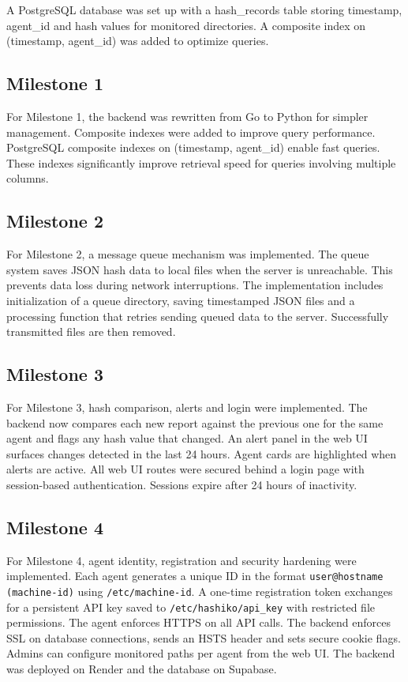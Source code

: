 \documentclass[conference]{IEEEtran}
\begin{document}
A PostgreSQL database was set up with a hash\_records table storing timestamp, agent\_id and hash values for monitored directories. A composite index on (timestamp, agent\_id) was added to optimize queries.

\subsection{Milestone 1}

For Milestone 1, the backend was rewritten from Go to Python for simpler management. Composite indexes were added to improve query performance. PostgreSQL composite indexes on (timestamp, agent\_id) enable fast queries. These indexes significantly improve retrieval speed for queries involving multiple columns.

\subsection{Milestone 2}

For Milestone 2, a message queue mechanism was implemented. The queue system saves JSON hash data to local files when the server is unreachable. This prevents data loss during network interruptions. The implementation includes initialization of a queue directory, saving timestamped JSON files and a processing function that retries sending queued data to the server. Successfully transmitted files are then removed.

\subsection{Milestone 3}

For Milestone 3, hash comparison, alerts and login were implemented. The backend now compares each new report against the previous one for the same agent and flags any hash value that changed. An alert panel in the web UI surfaces changes detected in the last 24 hours. Agent cards are highlighted when alerts are active. All web UI routes were secured behind a login page with session-based authentication. Sessions expire after 24 hours of inactivity.

\subsection{Milestone 4}

For Milestone 4, agent identity, registration and security hardening were implemented. Each agent generates a unique ID in the format \texttt{user@hostname (machine-id)} using \texttt{/etc/machine-id}. A one-time registration token exchanges for a persistent API key saved to \texttt{/etc/hashiko/api\_key} with restricted file permissions. The agent enforces HTTPS on all API calls. The backend enforces SSL on database connections, sends an HSTS header and sets secure cookie flags. Admins can configure monitored paths per agent from the web UI. The backend was deployed on Render and the database on Supabase.
\end{document}
